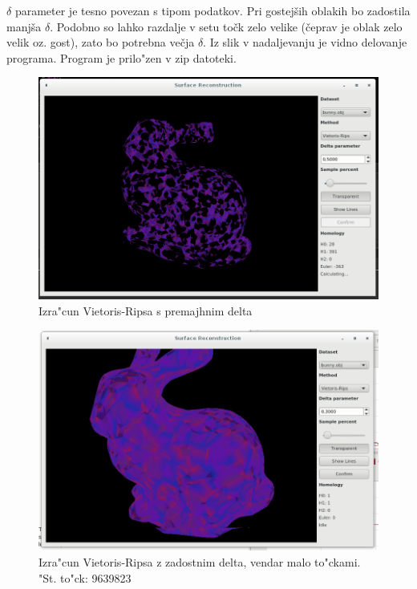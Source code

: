 \documentclass[11pt]{article}
\begin{document}
$\delta$ parameter je tesno povezan s tipom podatkov. Pri gostejših oblakih bo zadostila manjša $\delta$. Podobno so lahko razdalje v setu točk zelo velike (čeprav je oblak zelo velik oz. gost), zato bo potrebna večja $\delta$. Iz slik v nadaljevanju je vidno delovanje programa. Program je prilo"zen v zip datoteki.

\begin{figure}[htb]
    \centering
    \includegraphics[width=1\textwidth]{vr_long.png}
    \caption{Izra"cun Vietoris-Ripsa s premajhnim delta}
    \label{fig:vr1}
\end{figure}


\begin{figure}[htb]
    \centering
    \includegraphics[width=1\textwidth]{vr_full_9639823.png}
    \caption{Izra"cun Vietoris-Ripsa z zadostnim delta, vendar malo to"ckami. "St. to"ck: 9639823}
    \label{fig:vr2}
\end{figure}
\end{document}
